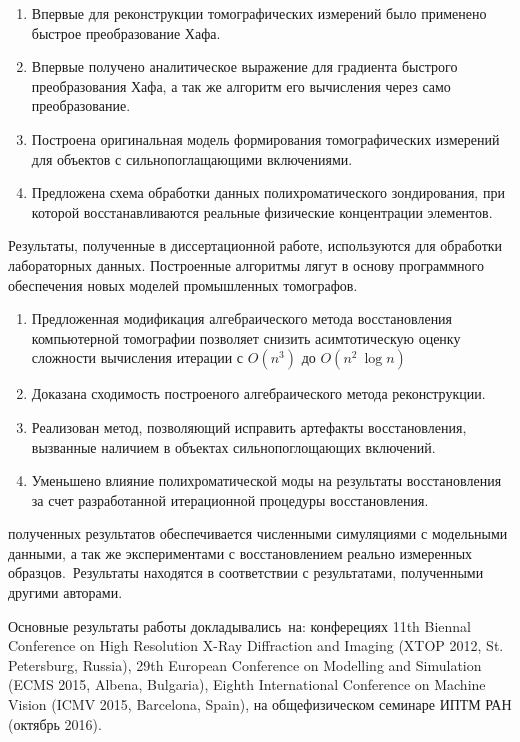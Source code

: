 {\novelty}
\begin{enumerate}
  \item Впервые для реконструкции томографических измерений было применено быстрое преобразование Хафа.
  \item Впервые получено аналитическое выражение для градиента быстрого преобразования Хафа, а так же алгоритм его вычисления через само преобразование.
  \item Построена оригинальная модель формирования томографических измерений для объектов с сильнопоглащающими включениями.
  \item Предложена схема обработки данных полихроматического зондирования, при которой восстанавливаются реальные физические концентрации элементов.
\end{enumerate}
{\influence} Результаты, полученные в диссертационной работе, используются для обработки лабораторных данных. Построенные алгоритмы лягут в основу программного обеспечения новых моделей промышленных томографов.

{}
\begin{enumerate}
  \item Предложенная модификация алгебраического метода восстановления компьютерной томографии позволяет снизить асимтотическую оценку сложности вычисления итерации с $O(n^3)$ до $O(n^2~\log n)$
  \item Доказана сходимость построеного алгебраического метода реконструкции. 
  \item Реализован метод, позволяющий исправить артефакты восстановления, вызванные наличием в объектах сильнопоглощающих включений.
  \item Уменьшено влияние полихроматической моды на результаты восстановления за счет разработанной итерационной процедуры восстановления.
\end{enumerate}


{\reliability} полученных результатов обеспечивается численными симуляциями с модельными данными, а так же экспериментами с восстановлением реально измеренных образцов.\ Результаты находятся в соответствии с результатами, полученными другими авторами.


{\probation}
Основные результаты работы докладывались~на: конферециях 
11th Biennal Conference on High Resolution X-Ray Diffraction and Imaging (XTOP 2012, St. Petersburg, Russia), 
29th European Conference on Modelling and Simulation (ECMS 2015, Albena, Bulgaria),
Eighth International Conference on Machine Vision (ICMV 2015, Barcelona, Spain),
на общефизическом семинаре ИПТМ РАН (октябрь 2016).

